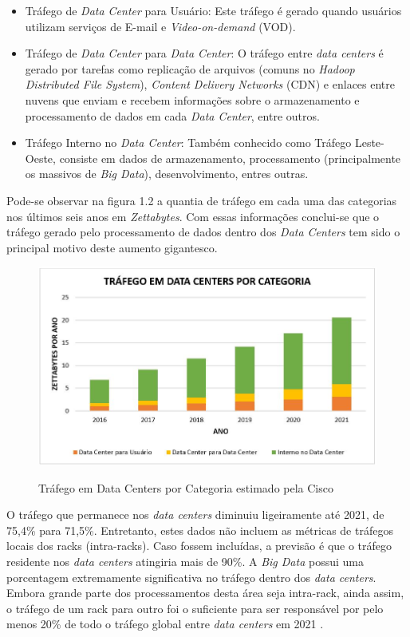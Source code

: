 \begin{itemize}
\item Tráfego de \emph{Data Center} para Usuário: Este tráfego é gerado quando usuários utilizam serviços de E-mail e \emph{Video-on-demand} (VOD).
\item Tráfego de \emph{Data Center} para \emph{Data Center}: O tráfego entre \emph{data centers} é gerado por tarefas como replicação de arquivos (comuns no \emph{Hadoop Distributed File System}), \emph{Content Delivery Networks} (CDN) e enlaces entre nuvens que enviam e recebem informações sobre o armazenamento e processamento de dados em cada \emph{Data Center}, entre outros.
\item Tráfego Interno no \emph{Data Center}: Também conhecido como Tráfego Leste-Oeste, consiste em dados de armazenamento, processamento (principalmente os massivos de \emph{Big Data}), desenvolvimento, entres outras.
\end{itemize}

Pode-se observar na figura 1.2 a quantia de tráfego em cada uma das categorias nos últimos seis anos em \emph{Zettabytes}. Com essas informações conclui-se que o tráfego gerado pelo processamento de dados dentro dos \emph{Data Centers} tem sido o principal motivo deste aumento gigantesco.

\begin{figure}[htp]
    \centering
    \includegraphics[width=12cm]{1-intro/Figura_2.jpg}
    \caption{Tráfego em Data Centers por Categoria estimado pela Cisco}
    \cite{index2018forecast}
    \label{fig:trafegoestimadoporcategoria}
\end{figure}

O tráfego que permanece nos \emph{data centers} diminuiu ligeiramente até 2021, de 75,4\% para 71,5\%. Entretanto, estes dados não incluem as métricas de tráfegos locais dos racks (intra-racks). Caso fossem incluídas, a previsão é que o tráfego residente nos \emph{data centers} atingiria mais de 90\%. A \emph{Big Data} possui uma porcentagem extremamente significativa no tráfego dentro dos \emph{data centers}. Embora grande parte dos processamentos desta área seja intra-rack, ainda assim, o tráfego de um rack para outro foi o suficiente para ser responsável por pelo menos 20\% de todo o tráfego global entre \emph{data centers} em 2021  \cite{index2018forecast}.

